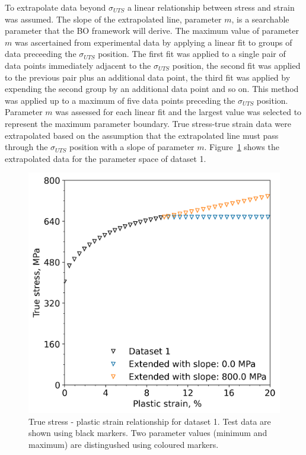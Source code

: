 \documentclass[preprint, review, 12pt]{elsarticle}
\begin{document}
{	To extrapolate data beyond $\sigma_{UTS}$ a linear relationship between stress and strain was assumed.
	The slope of the extrapolated line, parameter $m$, is a searchable parameter that the BO framework will derive.
	The maximum value of parameter $m$ was ascertained from experimental data by applying a linear fit to groups of data preceeding the $\sigma_{UTS}$ position.
	The first fit was applied to a single pair of data points immediately adjacent to the $\sigma_{UTS}$ position, the second fit was applied to the previous pair plus an additional data point, the third fit was applied by expending the second group by an additional data point and so on.
	This method was applied up to a maximum of five data points preceding the $\sigma_{UTS}$ position.
	Parameter $m$ was assessed for each linear fit and the largest value was selected to represent the maximum parameter boundary.
	True stress-true strain data were extrapolated based on the assumption that the extrapolated line must pass through the $\sigma_{UTS}$ position with a slope of parameter $m$.
	Figure~\ref{fig:extending_uts} shows the extrapolated data for the parameter space of dataset 1.
	\begin{figure}[!htbp]
		\centering
		\includegraphics[width=\linewidth, height=0.4\textheight, keepaspectratio]{ABAQUS_SLOPE_COMPARISON}
		\caption{True stress - plastic strain relationship for dataset 1. Test data are shown using black markers. Two parameter values (minimum and maximum) are distingushed using coloured markers.}
		\label{fig:extending_uts}
	\end{figure}

}
\end{document}
